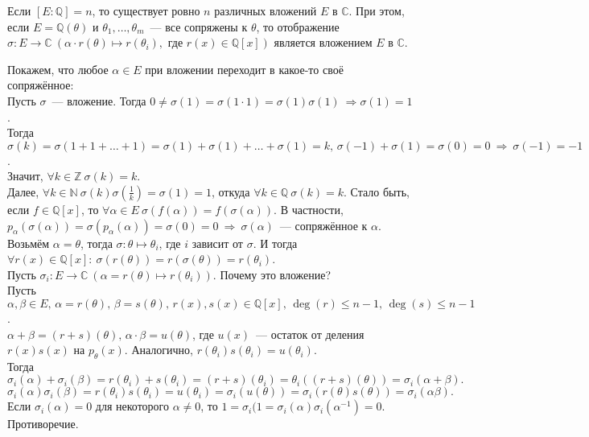 \begin{theorem} \label{l12_th6}
	Если $[E \colon \mathbb{Q}] = n$, то существует ровно $n$ различных вложений $E$ в $\mathbb{C}$.
	При этом, если $E = \mathbb{Q}(\theta)$ и $\theta_1, \dots, \theta_m$ — все сопряжены к $\theta$, то отображение $\sigma \colon E \to \mathbb{C} \ (\alpha \cdot r(\theta) \mapsto r(\theta_i), \text{ где } r(x)\in\mathbb{Q}[x])$ является вложением $E$ в $\mathbb{C}$.
\end{theorem}
\begin{pf}
	Покажем, что любое $\alpha \in E$ при вложении переходит в какое-то своё сопряжённое:\\
	Пусть $\sigma$ — вложение. Тогда $0 \ne \sigma(1) = \sigma(1 \cdot 1) = \sigma(1)\sigma(1) \ \Rightarrow \sigma(1)=1$.\\
	Тогда $\sigma(k) = \sigma(1+1+\dots+1) = \sigma(1)+\sigma(1)+\dots+\sigma(1) = k, \, \sigma(-1)+\sigma(1)=\sigma(0)=0 \ \Rightarrow \ \sigma(-1)=-1$.\\
	Значит, $\forall k \in \mathbb{Z} \ \sigma(k)=k$.\\
	Далее, $\forall k \in \mathbb{N} \ \sigma(k)\sigma\left(\frac{1}{k}\right) = \sigma(1) = 1$, откуда $\forall k \in \mathbb{Q} \ \sigma(k)=k$. Стало быть, если $f \in \mathbb{Q}[x]$, то $\forall \alpha \in E \ \sigma(f(\alpha)) = f(\sigma(\alpha))$. В частности, $p_\alpha(\sigma(\alpha)) = \sigma(p_\alpha(\alpha)) = \sigma(0) = 0 \ \Rightarrow \ \sigma(\alpha)$ — сопряжённое к $\alpha$.\\
	Возьмём $\alpha = \theta$, тогда $\sigma \colon \theta \mapsto \theta_i$, где $i$ зависит от $\sigma$. И тогда $\forall r(x) \in \mathbb{Q}[x]: \ \sigma(r(\theta)) = r(\sigma(\theta)) = r(\theta_i)$.\\
	Пусть $\sigma_i\colon E \to \mathbb{C} \ (\alpha = r(\theta) \mapsto r(\theta_i))$. Почему это вложение?\\
	Пусть $\alpha, \beta \in E, \, \alpha = r(\theta), \, \beta = s(\theta), \, r(x), s(x) \in \mathbb{Q}[x], \, \deg(r) \leq n-1, \, \deg(s) \leq n-1$.\\
	$\alpha + \beta = (r+s)(\theta), \, \alpha \cdot \beta = u(\theta)$, где $u(x)$ — остаток от деления $r(x)s(x)$ на $p_\theta(x)$. Аналогично, $r(\theta_i)s(\theta_i) = u(\theta_i)$.\\
	Тогда
	$$\sigma_i(\alpha)+\sigma_i(\beta) = r(\theta_i)+s(\theta_i) = (r+s)(\theta_i) = \theta_i((r+s)(\theta)) = \sigma_i(\alpha+\beta).$$
	$$\sigma_i(\alpha)\sigma_i(\beta) = r(\theta_i)s(\theta_i) = u(\theta_i) = \sigma_i(u(\theta)) = \sigma_i(r(\theta)s(\theta)) = \sigma_i(\alpha\beta).$$
	Если $\sigma_i(\alpha) = 0$ для некоторого $\alpha \ne 0$, то $1=\sigma_i(1 =\sigma_i(\alpha)\sigma_i(\alpha^{-1})=0$.
	Противоречие.
\end{pf}

